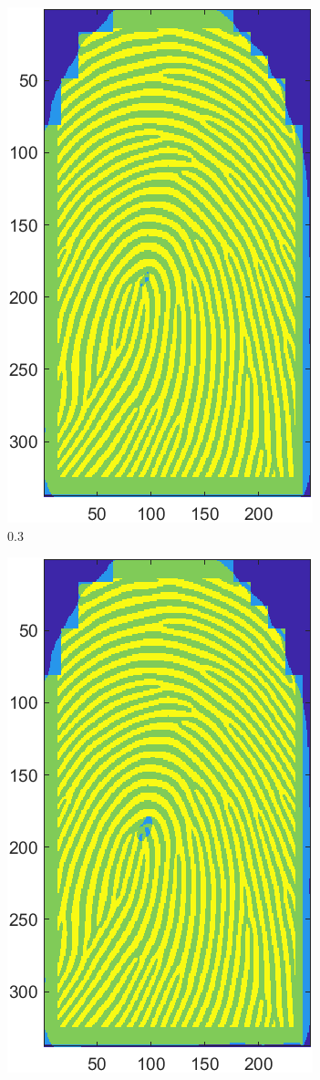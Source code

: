 \documentclass[a4paper]{article}
\begin{document}
\begin{figure}[H]
\begin{subfigure}[t]{0.2\textwidth}
         \includegraphics[scale=0.5]{Figures/E4-e2-0.3}
         \caption{\(0.3\)}
     \end{subfigure}
     \begin{subfigure}[t]{0.2\textwidth}
      \centering
      \includegraphics[scale=0.5]{Figures/E4-e2-0.6}

\end{subfigure}
\end{figure}
\end{document}
